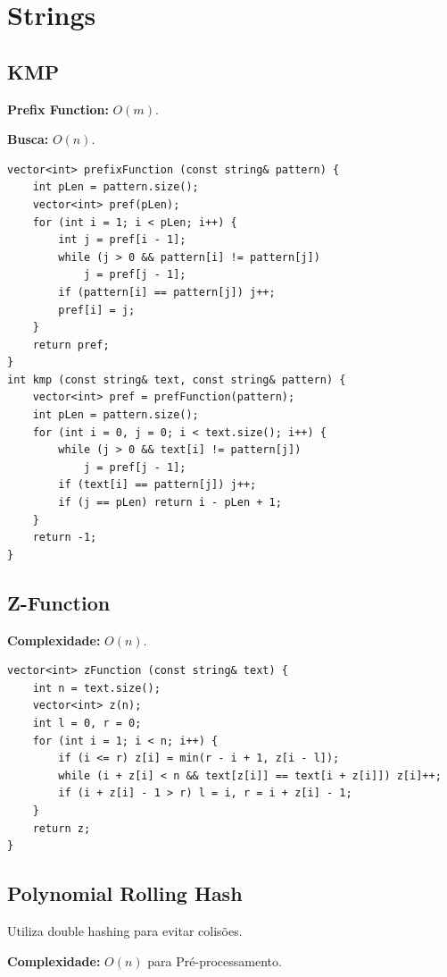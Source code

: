 \section{Strings}

\subsection{KMP}

\textbf{Prefix Function:} $O(m)$.

\textbf{Busca:} $O(n)$.

\begin{lstlisting}
vector<int> prefixFunction (const string& pattern) {
    int pLen = pattern.size();
    vector<int> pref(pLen);
    for (int i = 1; i < pLen; i++) {
        int j = pref[i - 1];
        while (j > 0 && pattern[i] != pattern[j]) 
            j = pref[j - 1];
        if (pattern[i] == pattern[j]) j++;
        pref[i] = j;
    }
    return pref;
}
int kmp (const string& text, const string& pattern) {
    vector<int> pref = prefFunction(pattern);
    int pLen = pattern.size();
    for (int i = 0, j = 0; i < text.size(); i++) {
        while (j > 0 && text[i] != pattern[j])
            j = pref[j - 1];
        if (text[i] == pattern[j]) j++;
        if (j == pLen) return i - pLen + 1;
    }
    return -1;
}
\end{lstlisting}


\subsection{Z-Function}

\textbf{Complexidade:} $O(n)$.

\begin{lstlisting}
vector<int> zFunction (const string& text) {
    int n = text.size();
    vector<int> z(n);
    int l = 0, r = 0;
    for (int i = 1; i < n; i++) {
        if (i <= r) z[i] = min(r - i + 1, z[i - l]);
        while (i + z[i] < n && text[z[i]] == text[i + z[i]]) z[i]++;
        if (i + z[i] - 1 > r) l = i, r = i + z[i] - 1;
    }
    return z;
}
\end{lstlisting}


\subsection{Polynomial Rolling Hash}

Utiliza double hashing para evitar colisões.

\textbf{Complexidade:} $O(n)$ para Pré-processamento.

